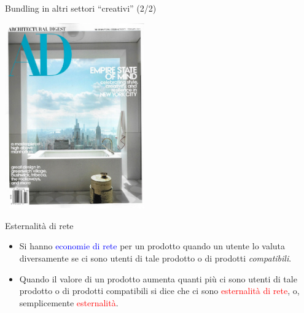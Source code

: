 \documentclass{beamer}
\begin{document}
\begin{frame}
{\centerline{Bundling in altri settori ``creativi'' (2/2)}}
\begin{center}
    \includegraphics[width=0.45\textwidth]{A2022.IDSEPC.ConcettoDiSoftware/BundlingAD.pdf}
\end{center}

\end{frame}


\begin{frame}
{\centerline{Esternalit\`{a} di rete}}

\begin{itemize}
\item Si hanno \textcolor{blue}{economie di rete} per un prodotto quando un utente lo valuta  diversamente se ci sono utenti di tale prodotto o di prodotti \textit{compatibili}.

\item Quando il valore di un prodotto aumenta quanti pi\`{u} ci sono utenti di tale prodotto o di prodotti compatibili si dice che ci sono \textcolor{red}{esternalit\`{a} di rete}, o, semplicemente \textcolor{red}{esternalit\`{a}}.


\end{itemize}

\end{frame}
\end{document}

